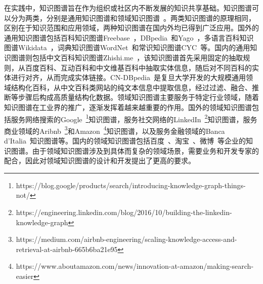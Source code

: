 \documentclass[algorithmlist, AutoFakeBold, AutoFakeSlant, figurelist, tablelist, nomlist, engineering]{seuthesix}
\begin{document}
在实践中，知识图谱旨在作为组织或社区内不断发展的知识共享基础。知识图谱可以分为两类，分别是通用知识图谱和领域知识图谱~\cite{hogan2021knowledge}。两类知识图谱的原理相同，区别在于知识范围和应用领域，两种知识图谱在国内外均已得到广泛应用。国外的通用知识图谱包括百科知识图谱Freebase~\cite{bollacker2007platform}，DBpedia~\cite{lehmann2015dbpedia}和Yago~\cite{hoffart2011yago2}，多语言百科知识图谱Wikidata~\cite{vrandevcic2014wikidata}，词典知识图谱WordNet~\cite{miller2007wordnet}和常识知识图谱CYC~\cite{lenat1995cyc}等。国内的通用知识图谱则包括中文百科知识图谱Zhishi.me~\cite{niu2011zhishi}，该知识图谱首先采用固定的抽取规则，从百度百科、互动百科和中文维基百科中抽取实体信息，随后对不同百科的实体进行对齐，从而完成实体链接。CN-DBpedia~\cite{xu2017cn}是复旦大学开发的大规模通用领域结构化百科，从中文百科类网站的纯文本信息中提取信息，经过过滤、融合、推断等步骤后构成高质量结构化数据。领域知识图谱主要服务于特定行业领域，随着知识图谱在工业界的推广，逐渐发挥着越来越重要的作用。国外的领域知识图谱包括服务网络搜索的Google~\footnote{https://blog.google/products/search/introducing-knowledge-graph-things-not/}知识图谱，服务社交网络的LinkedIn~\footnote{https://engineering.linkedin.com/blog/2016/10/building-the-linkedin-knowledge-graph}知识图谱，服务商业领域的Aribnb~\footnote{https://medium.com/airbnb-engineering/scaling-knowledge-access-and-retrieval-at-airbnb-665b6ba21e95}和Amazon~\footnote{https://www.aboutamazon.com/news/innovation-at-amazon/making-search-easier}知识图谱，以及服务金融领域的Banca d’Italia~\cite{bellomarini2019knowledge}知识图谱等。国内的领域知识图谱包括百度~\cite{wang2013xlore}、淘宝~\cite{xu2021alime}、微博~\cite{wei2020analysis}等企业的知识图谱。由于领域知识图谱涉及到具体而复杂的领域场景，需要业务和开发专家的配合，因此对领域知识图谱的设计和开发提出了更高的要求。
\end{document}
